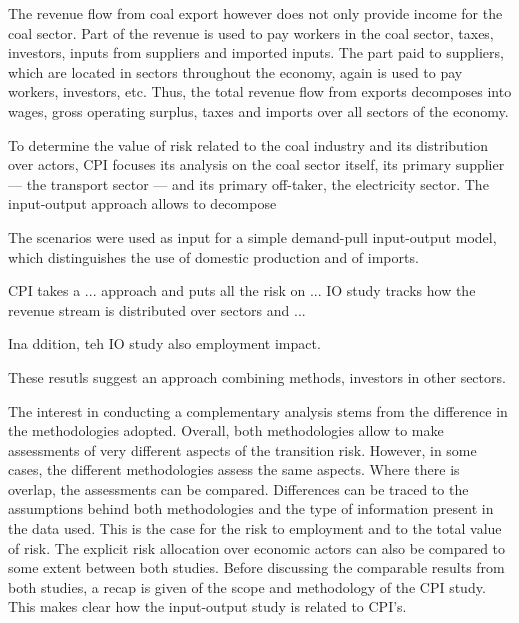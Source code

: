 \documentclass[12pt,english]{article}
\begin{document}
The revenue flow from coal export however does not only provide income for the coal sector. Part of the revenue is used to pay workers in the coal sector, taxes, investors, inputs from suppliers and imported inputs. The part paid to suppliers, which are located in sectors throughout the economy, again is used to pay workers, investors, etc. Thus, the total revenue flow from exports decomposes into wages, gross operating surplus, taxes and imports over all sectors of the economy. 

To determine the value of risk related to the coal industry and its distribution over actors, CPI focuses its analysis on the coal sector itself, its primary supplier --- the transport sector --- and its primary off-taker, the electricity sector. The input-output approach allows to decompose  


 The scenarios were used as input for a simple demand-pull input-output model, which distinguishes the use of domestic production and of imports. 

CPI takes a ... approach and puts all the risk on ... 
IO study tracks how the revenue stream is distributed over sectors and ... 

Ina ddition, teh IO study also employment impact. 

These resutls suggest an approach combining methods, investors in other sectors. 

The interest in %
conducting a complementary analysis stems from the difference in the methodologies adopted. Overall, both methodologies allow to make assessments of very different aspects of the transition risk. However, in some cases, the different methodologies assess the same aspects. %
Where there is overlap, the assessments can be compared. Differences can be traced to the assumptions behind both methodologies and the type of information present in the data used. This is the case for the risk %
to employment and to the total value of risk. The explicit risk allocation over economic actors can also be compared to some extent between both studies. %
Before discussing the comparable results from both studies, a recap is given of the scope and methodology of the CPI study. This makes clear how the input-output study is related to CPI's. 
\end{document}
